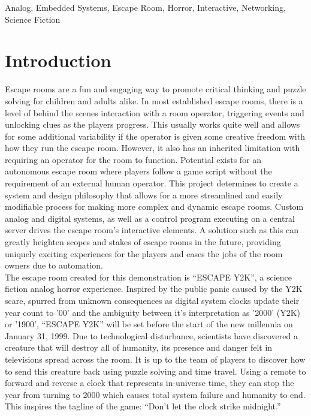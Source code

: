 \documentclass[conference]{IEEEtran}
\begin{document}
\begin{IEEEkeywords}
    Analog, Embedded Systems, Escape Room, Horror, Interactive, Networking, Science Fiction
\end{IEEEkeywords}

\section{Introduction}
Escape rooms are a fun and engaging way to promote critical thinking and puzzle solving for children and adults
alike. In most established escape rooms, there is a level of behind the scenes interaction with a room operator,
triggering events and unlocking clues as the players progress. This usually works quite well and allows for some
additional variability if the operator is given some creative freedom with how they run the escape room. However,
it also has an inherited limitation with requiring an operator for the room to function. Potential exists for an
autonomous escape room where players follow a game script without the requirement of an external human operator.
This project determines to create a system and design philosophy that allows for a more streamlined and easily modifiable
process for making more complex and dynamic escape rooms. Custom analog and digital systems, as well as a control program
executing on a central server drives the escape room's interactive elements. A solution such as this can greatly
heighten scopes and stakes of escape rooms in the future, providing uniquely exciting experiences for the players
and eases the jobs of the room owners due to automation.
\\
\indent The escape room created for this demonstration is ``ESCAPE Y2K'', a science fiction analog horror experience. 
Inspired by the public panic caused by the Y2K scare, spurred from unknown consequences as digital system
clocks update their year count to '00' and the ambiguity between it's interpretation as '2000' (Y2K) or '1900',
``ESCAPE Y2K'' will be set before the start of the new millennia on January 31, 1999. Due to technological disturbance,
scientists have discovered a creature that will destroy all of humanity, its presence and danger felt in televisions
spread across the room. It is up to the team of players to discover how to send this creature back using puzzle solving
and time travel. Using a remote to forward and reverse a clock that represents in-universe time, they can stop the year
from turning to 2000 which causes total system failure and humanity to end. This inspires the tagline of the game:
``Don't let the clock strike midnight.''
\end{document}
